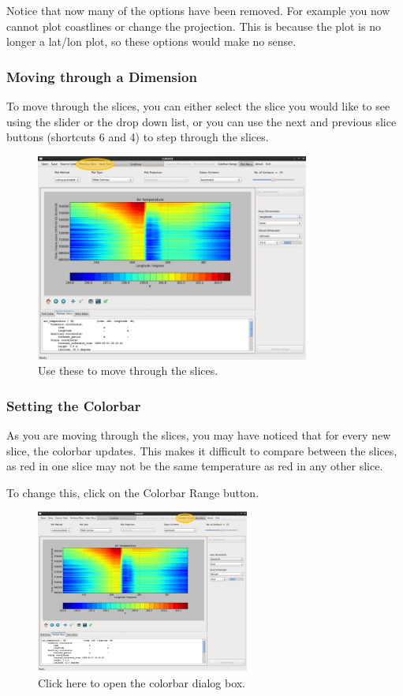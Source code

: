 \documentclass[a4paper,12pt]{article}
\begin{document}
Notice that now many of the options have been removed. For example you now
cannot plot coastlines or change the projection. This is because the plot is
no longer a lat/lon plot, so these options would make no sense.

\subsubsection{Moving through a Dimension}

To move through the slices, you can either select the slice you would like to
see using the slider or the drop down list, or you can use the next and previous
slice buttons (shortcuts 6 and 4) to step through the slices.

\begin{figure}[H]
\centering
\includegraphics[width=90mm]{resources/tute13.PNG}
\caption{Use these to move through the slices.}
\label{overflow}
\end{figure}

\subsubsection{Setting the Colorbar}

As you are moving through the slices, you may have noticed that for every new
slice, the colorbar updates. This makes it difficult to compare between the
slices, as red in one slice may not be the same temperature as red in any other
slice.

To change this, click on the Colorbar Range button.

\begin{figure}[H]
\centering
\includegraphics[width=70mm]{resources/tute14.PNG}
\caption{Click here to open the colorbar dialog box.}
\label{overflow}
\end{figure}
\end{document}
